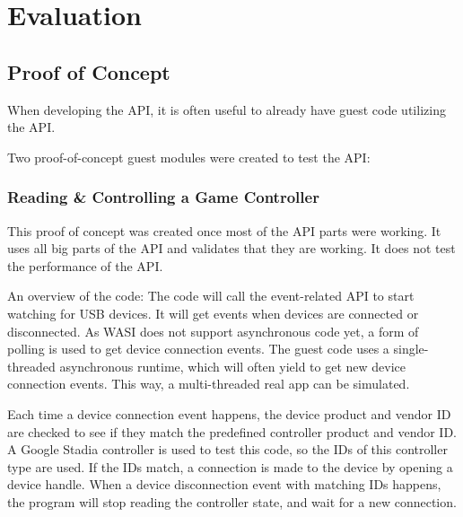 \chapter{Evaluation}

\section{Proof of Concept}
When developing the API, it is often useful to already have guest code utilizing the API.

Two proof-of-concept guest modules were created to test the API:

\subsection{Reading \& Controlling a Game Controller}

This proof of concept was created once most of the API parts were working. It uses all big parts of the API and validates that they are working. It does not test the performance of the API.

An overview of the code:
The code will call the event-related API to start watching for USB devices. It will get events when devices are connected or disconnected. As WASI does not support asynchronous code yet, a form of polling is used to get device connection events. The guest code uses a single-threaded asynchronous runtime, which will often yield to get new device connection events. This way, a multi-threaded real app can be simulated.

Each time a device connection event happens, the device product and vendor ID are checked to see if they match the predefined controller product and vendor ID. A Google Stadia controller is used to test this code, so the IDs of this controller type are used. If the IDs match, a connection is made to the device by opening a device handle. When a device disconnection event with matching IDs happens, the program will stop reading the controller state, and wait for a new connection.

